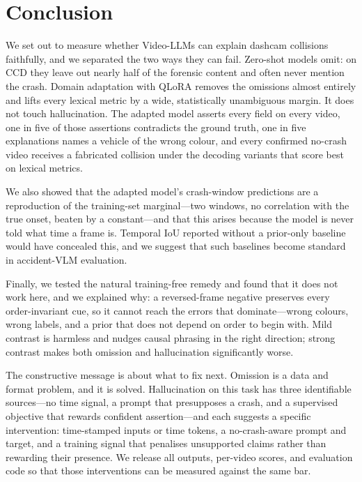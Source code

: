\section{Conclusion}
\label{sec:conclusion}

We set out to measure whether Video-LLMs can explain dashcam collisions faithfully, and we separated the two ways they can fail.
Zero-shot models omit: on CCD they leave out nearly half of the forensic content and often never mention the crash.
Domain adaptation with QLoRA removes the omissions almost entirely and lifts every lexical metric by a wide, statistically unambiguous margin.
It does not touch hallucination.
The adapted model asserts every field on every video, one in five of those assertions contradicts the ground truth, one in five explanations names a vehicle of the wrong colour, and every confirmed no-crash video receives a fabricated collision under the decoding variants that score best on lexical metrics.

We also showed that the adapted model's crash-window predictions are a reproduction of the training-set marginal---two windows, no correlation with the true onset, beaten by a constant---and that this arises because the model is never told what time a frame is.
Temporal IoU reported without a prior-only baseline would have concealed this, and we suggest that such baselines become standard in accident-VLM evaluation.

Finally, we tested the natural training-free remedy and found that it does not work here, and we explained why: a reversed-frame negative preserves every order-invariant cue, so it cannot reach the errors that dominate---wrong colours, wrong labels, and a prior that does not depend on order to begin with.
Mild contrast is harmless and nudges causal phrasing in the right direction; strong contrast makes both omission and hallucination significantly worse.

The constructive message is about what to fix next.
Omission is a data and format problem, and it is solved.
Hallucination on this task has three identifiable sources---no time signal, a prompt that presupposes a crash, and a supervised objective that rewards confident assertion---and each suggests a specific intervention: time-stamped inputs or time tokens, a no-crash-aware prompt and target, and a training signal that penalises unsupported claims rather than rewarding their presence.
We release all outputs, per-video scores, and evaluation code so that those interventions can be measured against the same bar.
